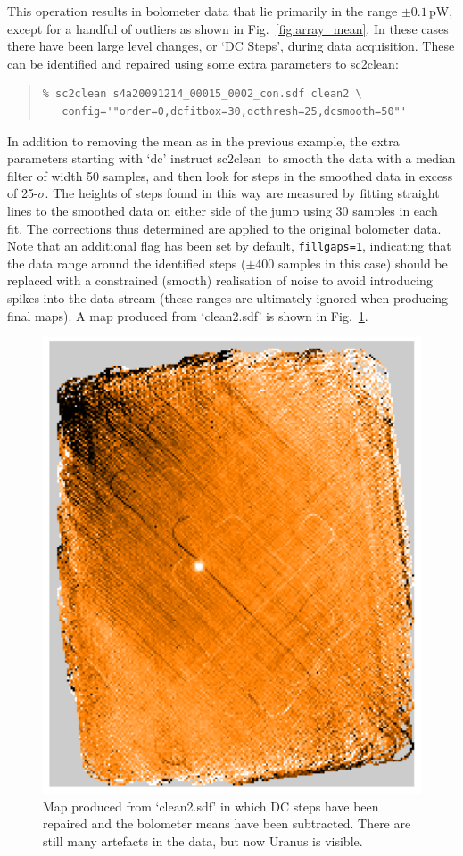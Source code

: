 \documentclass[twoside,11pt]{article}
\newcommand{\xref}[3]{#1}
\renewcommand{\_}{\texttt{\symbol{95}}}
\newenvironment{myquote}{\begin{quote}\begin{small}}{\end{small}\end{quote}}
\newcommand{\task}[1]{\textsf{#1}}
\newcommand{\clean}{\xref{\task{sc2clean}}{sun258}{SC2CLEAN}}
\begin{document}
This operation results in bolometer data that lie primarily in the
range $\pm 0.1$\,pW, except for a handful of outliers as shown in
Fig.~\ref{fig:array_mean}. In these cases there have been large level
changes, or `DC Steps', during data acquisition. These can
be identified and repaired using some extra parameters to \clean:

\begin{myquote}
\begin{verbatim}
% sc2clean s4a20091214_00015_0002_con.sdf clean2 \
   config='"order=0,dcfitbox=30,dcthresh=25,dcsmooth=50"'
\end{verbatim}
\end{myquote}

In addition to removing the mean as in the previous example, the extra
parameters starting with `dc' instruct \clean\ to smooth the data with
a median filter of width 50 samples, and then look for steps in the
smoothed data in excess of 25-$\sigma$. The heights of steps found in
this way are measured by fitting straight lines to the smoothed data
on either side of the jump using 30 samples in each fit. The
corrections thus determined are applied to the original bolometer
data.  Note that an additional flag has been set by default,
\texttt{fillgaps=1}, indicating that the data range around the
identified steps ($\pm 400$ samples in this case) should be replaced
with a constrained (smooth) realisation of noise to avoid introducing
spikes into the data stream (these ranges are ultimately ignored when
producing final maps). A map produced from `clean2.sdf' is shown in
Fig.~\ref{fig:map_dc_mean}.

\begin{figure}
\begin{center}
\includegraphics[width=0.5\linewidth]{sc19_map_mean_dc}
\caption{Map produced from `clean2.sdf' in which DC steps have been
  repaired and the bolometer means have been subtracted. There are
  still many artefacts in the data, but now Uranus is visible.}
\label{fig:map_dc_mean}
\end{center}
\end{figure}
\end{document}

